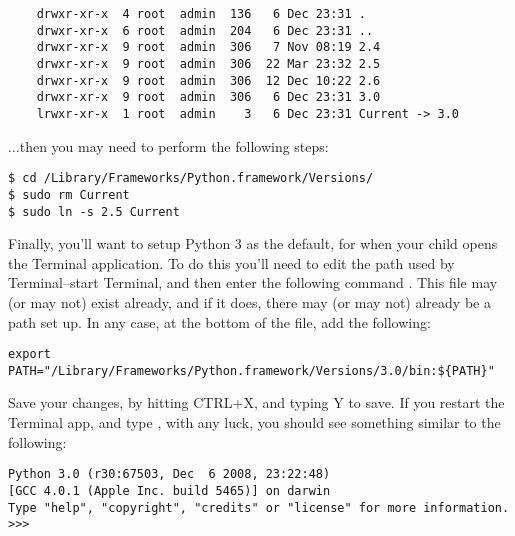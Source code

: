 \begin{MAC}
\begin{listing}
\begin{verbatim}
    drwxr-xr-x  4 root  admin  136   6 Dec 23:31 .
    drwxr-xr-x  6 root  admin  204   6 Dec 23:31 ..
    drwxr-xr-x  9 root  admin  306   7 Nov 08:19 2.4
    drwxr-xr-x  9 root  admin  306  22 Mar 23:32 2.5
    drwxr-xr-x  9 root  admin  306  12 Dec 10:22 2.6
    drwxr-xr-x  9 root  admin  306   6 Dec 23:31 3.0
    lrwxr-xr-x  1 root  admin    3   6 Dec 23:31 Current -> 3.0
\end{verbatim}
\end{listing}

\noindent
$\ldots$then you may need to perform the following steps:

\begin{listing}
\begin{verbatim}
$ cd /Library/Frameworks/Python.framework/Versions/
$ sudo rm Current
$ sudo ln -s 2.5 Current
\end{verbatim}
\end{listing}

Finally, you'll want to setup Python 3 as the default, for when your child opens the Terminal application. To do this you'll need to edit the path used by Terminal--start Terminal, and then enter the following command .  This file may (or may not) exist already, and if it does, there may (or may not) already be a path set up.  In any case, at the bottom of the file, add the following:

\begin{listing}
\begin{verbatim}
export PATH="/Library/Frameworks/Python.framework/Versions/3.0/bin:${PATH}"
\end{verbatim}
\end{listing}

Save your changes, by hitting CTRL+X, and typing Y to save. If you restart the Terminal app, and type , with any luck, you should see something similar to the following:

\begin{listing}
\begin{verbatim}
Python 3.0 (r30:67503, Dec  6 2008, 23:22:48) 
[GCC 4.0.1 (Apple Inc. build 5465)] on darwin
Type "help", "copyright", "credits" or "license" for more information.
>>>
\end{verbatim}
\end{listing}

\end{MAC}

